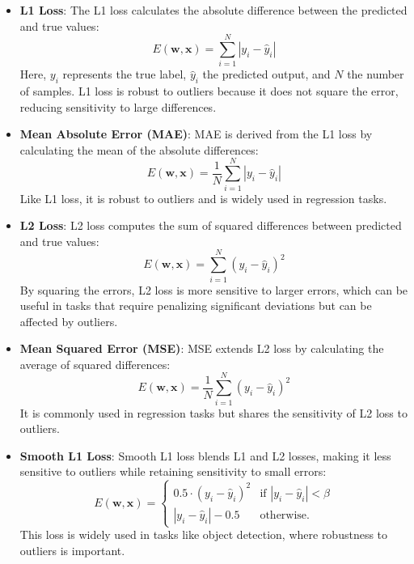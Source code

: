 \begin{itemize}
    \item \textbf{L1 Loss}:  
    The L1 loss calculates the absolute difference between the predicted and true values:
    \begin{equation}
        E(\mathbf{w}, \mathbf{x}) = \sum_{i=1}^{N} |y_i - \hat{y}_i|
    \end{equation}
    Here, \(y_i\) represents the true label, \(\hat{y}_i\) the predicted output, and \(N\) the number of samples. L1 loss is robust to outliers because it does not square the error, reducing sensitivity to large differences.

    \item \textbf{Mean Absolute Error (MAE)}:  
    MAE is derived from the L1 loss by calculating the mean of the absolute differences:
    \begin{equation}
        E(\mathbf{w}, \mathbf{x}) = \frac{1}{N} \sum_{i=1}^{N} |y_i - \hat{y}_i|
    \end{equation}
    Like L1 loss, it is robust to outliers and is widely used in regression tasks.

    \item \textbf{L2 Loss}:  
    L2 loss computes the sum of squared differences between predicted and true values:
    \begin{equation}
        E(\mathbf{w}, \mathbf{x}) = \sum_{i=1}^{N} (y_i - \hat{y}_i)^2
    \end{equation}
    By squaring the errors, L2 loss is more sensitive to larger errors, which can be useful in tasks that require penalizing significant deviations but can be affected by outliers.

    \item \textbf{Mean Squared Error (MSE)}:  
    MSE extends L2 loss by calculating the average of squared differences:
    \begin{equation}
        E(\mathbf{w}, \mathbf{x}) = \frac{1}{N} \sum_{i=1}^{N} (y_i - \hat{y}_i)^2
    \end{equation}
    It is commonly used in regression tasks but shares the sensitivity of L2 loss to outliers.

    \item \textbf{Smooth L1 Loss}:  
    Smooth L1 loss blends L1 and L2 losses, making it less sensitive to outliers while retaining sensitivity to small errors:
    \begin{equation}
        E(\mathbf{w}, \mathbf{x}) = 
        \begin{cases} 
            0.5 \cdot (y_i - \hat{y}_i)^2 & \text{if } |y_i - \hat{y}_i| < \beta \\
          |y_i - \hat{y}_i| - 0.5 & \text{otherwise.}
        \end{cases}
    \end{equation}
    This loss is widely used in tasks like object detection, where robustness to outliers is important.


\end{itemize}
